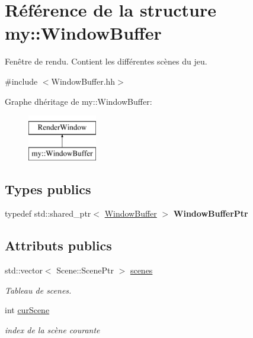\hypertarget{structmy_1_1WindowBuffer}{}\section{Référence de la structure my\+:\+:Window\+Buffer}
\label{structmy_1_1WindowBuffer}


Fenêtre de rendu. Contient les différentes scènes du jeu.  




{\ttfamily \#include $<$Window\+Buffer.\+hh$>$}

Graphe d\textquotesingle{}héritage de my\+:\+:Window\+Buffer\+:\begin{figure}[H]
\begin{center}
\leavevmode
\includegraphics[height=2.000000cm]{structmy_1_1WindowBuffer}
\end{center}
\end{figure}
\subsection*{Types publics}
\begin{DoxyCompactItemize}
\item 
\mbox{\label{structmy_1_1WindowBuffer_a1a2f9ba69300d5a3bf64a72384dfd058}} 
typedef std\+::shared\+\_\+ptr$<$ \hyperlink{structmy_1_1WindowBuffer}{Window\+Buffer} $>$ {\bfseries Window\+Buffer\+Ptr}
\end{DoxyCompactItemize}
\subsection*{Attributs publics}
\begin{DoxyCompactItemize}
\item 
\mbox{\label{structmy_1_1WindowBuffer_a0f89db90bad9e3e9d4d6e0ddf353139e}} 
std\+::vector$<$ Scene\+::\+Scene\+Ptr $>$ \hyperlink{structmy_1_1WindowBuffer_a0f89db90bad9e3e9d4d6e0ddf353139e}{scenes}
\begin{DoxyCompactList}\small\item\em Tableau de scenes. \end{DoxyCompactList}\item 
\mbox{\label{structmy_1_1WindowBuffer_ac357a41c574a5d8256112c6f496a0c34}} 
int \hyperlink{structmy_1_1WindowBuffer_ac357a41c574a5d8256112c6f496a0c34}{cur\+Scene}
\begin{DoxyCompactList}\small\item\em index de la scène courante \end{DoxyCompactList}\end{DoxyCompactItemize}



